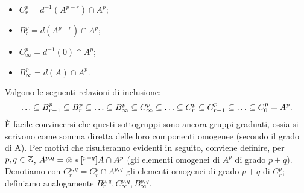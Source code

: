 \begin{itemize}
\item $C^p_r=d^{-1}(A^{p-r})\cap A^p$;
\item $B^p_r=d(A^{p+r})\cap A^p$;
\item $C^p_\infty=d^{-1}(0)\cap A^p$;
\item $B^p_\infty=d(A)\cap A^p$.
\end{itemize}
Valgono le seguenti relazioni di inclusione:
$$
\ldots\subseteq B^p_{r-1}\subseteq B^p_r\subseteq\ldots\subseteq B^p_\infty\subseteq C^p_\infty\subseteq\ldots\subseteq C^p_r\subseteq C^p_{r-1}\subseteq\ldots\subseteq C^p_0=A^p.
$$
È facile convincersi che questi sottogruppi sono ancora gruppi graduati, ossia si scrivono come somma diretta delle loro componenti omogenee (secondo il grado di A). Per motivi che risulteranno evidenti in seguito, conviene definire, per $p,q\in\mathbb{Z}$, $A^{p,q}=\mathbin{\otimes}*[^{p+q}]{A}{}\cap A^p$ (gli elementi omogenei di $A^p$ di grado $p+q$). Denotiamo con $C^{p,q}_r=C^p_r\cap A^{p,q}$ gli elementi omogenei di grado $p+q$ di $C^p_r$; definiamo analogamente $B^{p,q}_r,C^{p,q}_\infty,B^{p,q}_\infty$.

